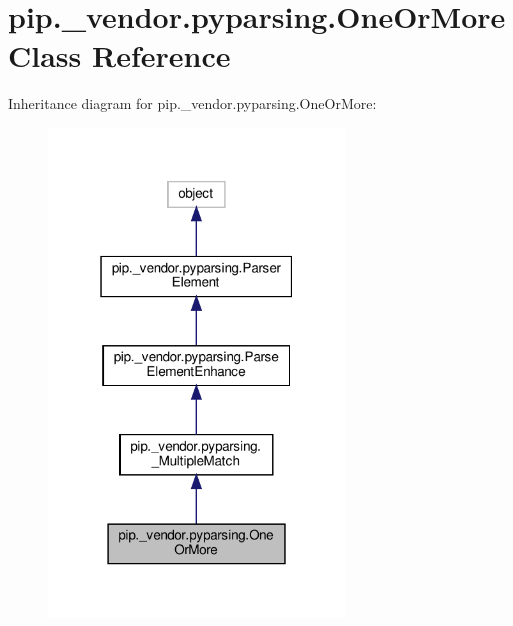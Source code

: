 \hypertarget{classpip_1_1__vendor_1_1pyparsing_1_1OneOrMore}{}\section{pip.\+\_\+vendor.\+pyparsing.\+One\+Or\+More Class Reference}
\label{classpip_1_1__vendor_1_1pyparsing_1_1OneOrMore}


Inheritance diagram for pip.\+\_\+vendor.\+pyparsing.\+One\+Or\+More\+:
\nopagebreak
\begin{figure}[H]
\begin{center}
\leavevmode
\includegraphics[width=223pt]{classpip_1_1__vendor_1_1pyparsing_1_1OneOrMore__inherit__graph}
\end{center}
\end{figure}


